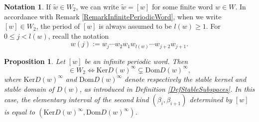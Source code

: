 \documentclass[12pt]{amsart}
\newtheorem{proposition}[theorem]{Proposition}
\theoremstyle{definition}
\newtheorem{notation}[theorem]{Notation}
\renewcommand{\tilde}{\widetilde}
\newcommand{\<}{\langle}   %
\renewcommand{\>}{\rangle} %
\begin{document}
\begin{notation}
    If $\tilde w \in W_2$, we can write $\tilde w = [w]$ for some finite word $w\in W$. In accordance with Remark \ref{RemarkInfinitePeriodicWord}, when we write $[w] \in W_2$, the period of $[w]$ is always assumed to be $l(w) \geq 1$. For $0 \leq j < l(w)$, recall the notation 
    \begin{equation*}
        w(j) := w_j\cdots w_2w_1w_{l(w)}\cdots w_{j+2}w_{j+1}.
    \end{equation*}
\end{notation}

\begin{proposition}\label{EveryElementaryIntervalSecondKindIsStable}
    Let $[w]$ be an infinite periodic word. Then 
    \begin{equation*}
        [w] \in W_2 \iff \mathrm{Ker}D(w)^{\infty} \subsetneq \mathrm{Dom}D(w)^{\infty},      
    \end{equation*}
    where $\mathrm{Ker}D(w)^{\infty}$ and $\mathrm{Dom}D(w)^{\infty}$ denote respectively the stable kernel and stable domain of $D(w)$, as introduced in Definition \ref{DefStableSubspaces}. In this case, the elementary interval of the second kind $(\beta_i,\beta_{i+1})$ determined by $[w]$ is equal to $(\mathrm{Ker}D(w)^{\infty}, \mathrm{Dom}D(w)^{\infty})$.
\end{proposition}
\end{document}
